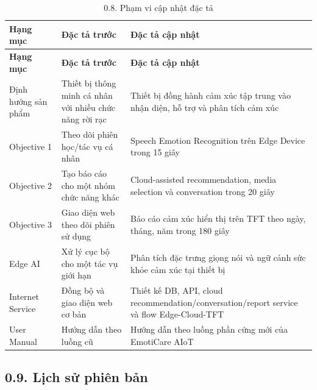 \documentclass[12pt,a4paper]{article}
\begin{document}
\begin{center}
\begin{longtable}{|P{0.25\textwidth}|P{0.32\textwidth}|P{0.33\textwidth}|}
\caption{0.8. Phạm vi cập nhật đặc tả}\\
\hline
\textbf{Hạng mục} & \textbf{Đặc tả trước} & \textbf{Đặc tả cập nhật} \\
\hline
\endfirsthead
\hline
\textbf{Hạng mục} & \textbf{Đặc tả trước} & \textbf{Đặc tả cập nhật} \\
\hline
\endhead
Định hướng sản phẩm & Thiết bị thông minh cá nhân với nhiều chức năng rời rạc & Thiết bị đồng hành cảm xúc tập trung vào nhận diện, hỗ trợ và phân tích cảm xúc \\
\hline
Objective 1 & Theo dõi phiên học/tác vụ cá nhân & Speech Emotion Recognition trên Edge Device trong 15 giây \\
\hline
Objective 2 & Tạo báo cáo cho một nhóm chức năng khác & Cloud-assisted recommendation, media selection và conversation trong 20 giây \\
\hline
Objective 3 & Giao diện web theo dõi phiên sử dụng & Báo cáo cảm xúc hiển thị trên TFT theo ngày, tháng, năm trong 180 giây \\
\hline
Edge AI & Xử lý cục bộ cho một tác vụ giới hạn & Phân tích đặc trưng giọng nói và ngữ cảnh sức khỏe cảm xúc tại thiết bị \\
\hline
Internet Service & Đồng bộ và giao diện web cơ bản & Thiết kế DB, API, cloud recommendation/conversation/report service và flow Edge-Cloud-TFT \\
\hline
User Manual & Hướng dẫn theo luồng cũ & Hướng dẫn theo luồng phần cứng mới của EmotiCare AIoT \\
\hline
\end{longtable}
\end{center}

\subsection*{0.9. Lịch sử phiên bản}
\end{document}
